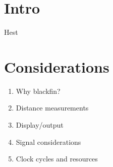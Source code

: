 \chapter{Intro}
Hest

\chapter{Considerations}
\begin{enumerate}
\item Why blackfin?
\item Distance measurements
\item Display/output
\item Signal considerations
\item Clock cycles and resources
\end{enumerate}

